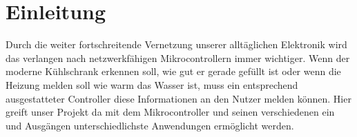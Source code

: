 \chapter{Einleitung}

Durch die weiter fortschreitende Vernetzung unserer alltäglichen Elektronik
wird das verlangen nach netzwerkfähigen Mikrocontrollern
immer wichtiger. Wenn der moderne Kühlschrank erkennen soll, wie gut er gerade
gefüllt ist oder wenn die Heizung melden soll wie warm das Wasser ist, muss ein
entsprechend ausgestatteter Controller diese Informationen an den Nutzer
melden können. Hier greift unser Projekt da mit dem Mikrocontroller und seinen
verschiedenen ein und Ausgängen unterschiedlichste Anwendungen ermöglicht
werden. 
